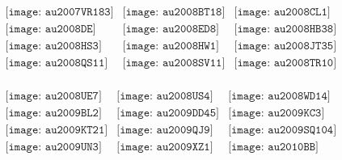\documentclass{article}
\begin{document}
\begin{figure}[H]
 \begin{center}$
 \begin{array}{cccc}
\texttt{[image: au2007VR183]}&\texttt{[image: au2008BT18]}&\texttt{[image: au2008CL1]}\\\texttt{[image: au2008DE]}&\texttt{[image: au2008ED8]}&\texttt{[image: au2008HB38]}\\\texttt{[image: au2008HS3]}&\texttt{[image: au2008HW1]}&\texttt{[image: au2008JT35]}\\\texttt{[image: au2008QS11]}&\texttt{[image: au2008SV11]}&\texttt{[image: au2008TR10]}\\
\end{array}$
\end{center}
\end{figure}

\begin{figure}[H]
 \begin{center}$
 \begin{array}{cccc}
\texttt{[image: au2008UE7]}&\texttt{[image: au2008US4]}&\texttt{[image: au2008WD14]}\\\texttt{[image: au2009BL2]}&\texttt{[image: au2009DD45]}&\texttt{[image: au2009KC3]}\\\texttt{[image: au2009KT21]}&\texttt{[image: au2009QJ9]}&\texttt{[image: au2009SQ104]}\\\texttt{[image: au2009UN3]}&\texttt{[image: au2009XZ1]}&\texttt{[image: au2010BB]}\\
\end{array}$
\end{center}
\end{figure}
\end{document}
